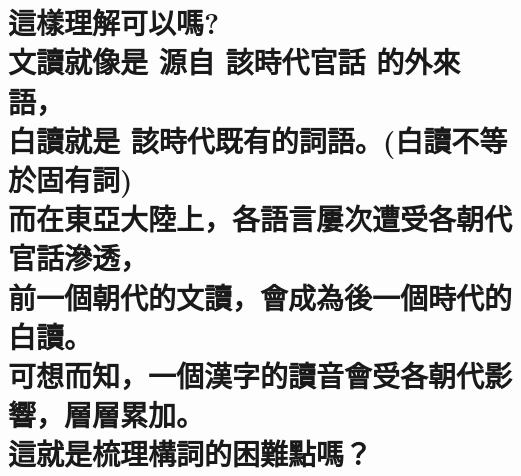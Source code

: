 %
% 
% 

\chapter[這樣理解可以嗎? 文讀就像是 源自 該時代官話 的外來語， 白讀就是 該時代既有的詞語。(白讀不等於固有詞) 而在東亞大陸上，各語言屢次遭受各朝代官話滲透， 前一個朝代的文讀，會成為後一個時代的白讀。 可想而知，一個漢字的讀音會受各朝代影響，層層累加。 這就是梳理構詞的困難點嗎？]{這樣理解可以嗎? \\[0.35em] 文讀就像是 源自 該時代官話 的外來語， \\[0.35em] 白讀就是 該時代既有的詞語。(白讀不等於固有詞) \\[0.35em] 而在東亞大陸上，各語言屢次遭受各朝代官話滲透， \\[0.35em] 前一個朝代的文讀，會成為後一個時代的白讀。 \\[0.35em] 可想而知，一個漢字的讀音會受各朝代影響，層層累加。 \\[0.35em] 這就是梳理構詞的困難點嗎？}

